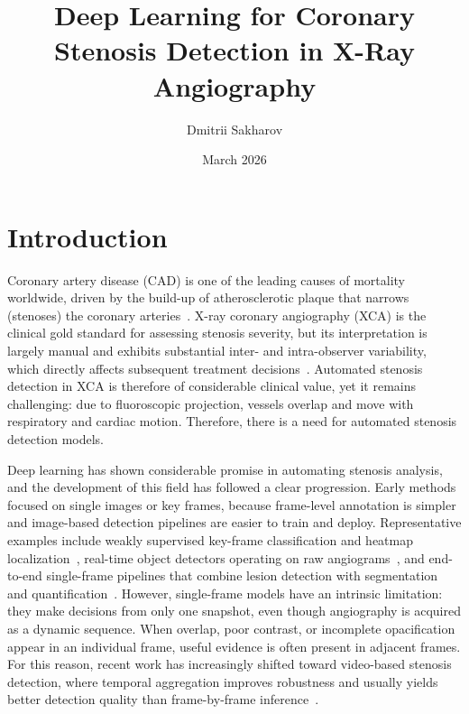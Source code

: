 \documentclass{article}
\title{Deep Learning for Coronary Stenosis Detection in X-Ray Angiography}
\author{Dmitrii Sakharov}
\date{March 2026}
\begin{document}
\maketitle

\section{Introduction}

Coronary artery disease (CAD) is one of the leading causes of mortality worldwide, driven by the build-up of atherosclerotic plaque that narrows (stenoses) the coronary arteries~\cite{popov2022reviewmodernapproachescoronary}. X-ray coronary angiography (XCA) is the clinical gold standard for assessing stenosis severity, but its interpretation is largely manual and exhibits substantial inter- and intra-observer variability, which directly affects subsequent treatment decisions~\cite{cardiovascular}. Automated stenosis detection in XCA is therefore of considerable clinical value, yet it remains challenging: due to fluoroscopic projection, vessels overlap and move with respiratory and cardiac motion. Therefore, there is a need for automated stenosis detection models.


Deep learning has shown considerable promise in automating stenosis analysis, and the development of this field has followed a clear progression. Early methods focused on single images or key frames, because frame-level annotation is simpler and image-based detection pipelines are easier to train and deploy. Representative examples include weakly supervised key-frame classification and heatmap localization~\cite{MOON2021105819}, real-time object detectors operating on raw angiograms~\cite{Danilov2021, attentionstenosis}, and end-to-end single-frame pipelines that combine lesion detection with segmentation and quantification~\cite{aipoweredrealtime, choudhary2026odysseiopensourceendtoendframework}. However, single-frame models have an intrinsic limitation: they make decisions from only one snapshot, even though angiography is acquired as a dynamic sequence. When overlap, poor contrast, or incomplete opacification appear in an individual frame, useful evidence is often present in adjacent frames. For this reason, recent work has increasingly shifted toward video-based stenosis detection, where temporal aggregation improves robustness and usually yields better detection quality than frame-by-frame inference~\cite{fvcm, PANG2021101900, HAN2023106546, STQD-Det, li2025ltyolo}.
\end{document}
